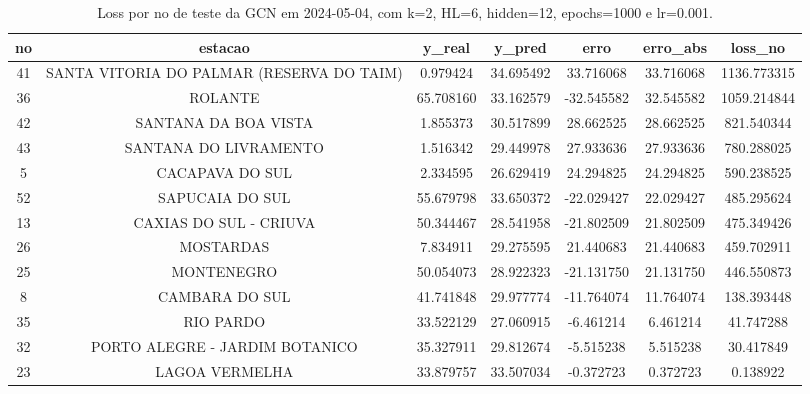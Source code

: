 \begin{table}[h]
\centering
\caption{Loss por no de teste da GCN em 2024-05-04, com k=2, HL=6, hidden=12, epochs=1000 e lr=0.001.}
\label{tab:gcn_loss_k2_hl6_h12_e1000_d20240504}
\begin{tabular}{ccccccc}
\toprule
no & estacao & y\_real & y\_pred & erro & erro\_abs & loss\_no \\
\midrule
41 & SANTA VITORIA DO PALMAR (RESERVA DO TAIM) & 0.979424 & 34.695492 & 33.716068 & 33.716068 & 1136.773315 \\
36 & ROLANTE & 65.708160 & 33.162579 & -32.545582 & 32.545582 & 1059.214844 \\
42 & SANTANA DA BOA VISTA & 1.855373 & 30.517899 & 28.662525 & 28.662525 & 821.540344 \\
43 & SANTANA DO LIVRAMENTO & 1.516342 & 29.449978 & 27.933636 & 27.933636 & 780.288025 \\
5 & CACAPAVA DO SUL & 2.334595 & 26.629419 & 24.294825 & 24.294825 & 590.238525 \\
52 & SAPUCAIA DO SUL & 55.679798 & 33.650372 & -22.029427 & 22.029427 & 485.295624 \\
13 & CAXIAS DO SUL - CRIUVA & 50.344467 & 28.541958 & -21.802509 & 21.802509 & 475.349426 \\
26 & MOSTARDAS & 7.834911 & 29.275595 & 21.440683 & 21.440683 & 459.702911 \\
25 & MONTENEGRO & 50.054073 & 28.922323 & -21.131750 & 21.131750 & 446.550873 \\
8 & CAMBARA DO SUL & 41.741848 & 29.977774 & -11.764074 & 11.764074 & 138.393448 \\
35 & RIO PARDO & 33.522129 & 27.060915 & -6.461214 & 6.461214 & 41.747288 \\
32 & PORTO ALEGRE - JARDIM BOTANICO & 35.327911 & 29.812674 & -5.515238 & 5.515238 & 30.417849 \\
23 & LAGOA VERMELHA & 33.879757 & 33.507034 & -0.372723 & 0.372723 & 0.138922 \\
\bottomrule
\end{tabular}
\end{table}
